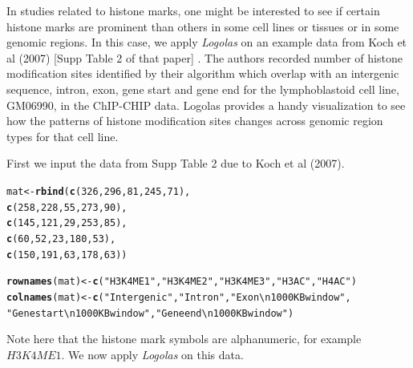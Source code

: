 \documentclass[12pt]{article}\usepackage[]{graphicx}\usepackage[usenames,dvipsnames]{color}
\makeatletter
\newcommand{\hlnum}[1]{\textcolor[rgb]{0.686,0.059,0.569}{#1}}%
\newcommand{\hlstr}[1]{\textcolor[rgb]{0.192,0.494,0.8}{#1}}%
\newcommand{\hlstd}[1]{\textcolor[rgb]{0.345,0.345,0.345}{#1}}%
\newcommand{\hlkwb}[1]{\textcolor[rgb]{0.69,0.353,0.396}{#1}}%
\newcommand{\hlkwd}[1]{\textcolor[rgb]{0.737,0.353,0.396}{\textbf{#1}}}%
\newenvironment{kframe}{%
 \def\at@end@of@kframe{}%
 \ifinner\ifhmode%
  \def\at@end@of@kframe{\end{minipage}}%
  \begin{minipage}{\columnwidth}%
 \fi\fi%
 \def\FrameCommand##1{\hskip\@totalleftmargin \hskip-\fboxsep
 \colorbox{shadecolor}{##1}\hskip-\fboxsep
     \hskip-\linewidth \hskip-\@totalleftmargin \hskip\columnwidth}%
 \MakeFramed {\advance\hsize-\width
   \@totalleftmargin\z@ \linewidth\hsize
   \@setminipage}}%
 {\par\unskip\endMakeFramed%
 \at@end@of@kframe}
\newenvironment{knitrout}{}{} %
\newcommand{\Logolas}{\textit{Logolas}}
\makeatother
\begin{document}
In studies related to histone marks, one might be interested to see if certain histone marks are prominent than others in some cell lines or tissues or in some genomic regions. In this case, we apply \Logolas{} on an example data from Koch et al (2007) [Supp Table 2 of that paper] \cite{Koch2007}. The authors recorded number of histone modification sites identified by their algorithm which overlap with an intergenic sequence, intron, exon, gene start and gene end for the lymphoblastoid cell line, GM06990, in the ChIP-CHIP data. Logolas provides a handy visualization to see how the patterns of histone modification sites changes across genomic region types for that cell line.

First we input the data from Supp Table 2 due to Koch et al (2007).

\begin{knitrout}
\color{fgcolor}\begin{kframe}
\begin{alltt}
\hlstd{mat} \hlkwb{<-} \hlkwd{rbind}\hlstd{(}\hlkwd{c}\hlstd{(}\hlnum{326}\hlstd{,} \hlnum{296}\hlstd{,} \hlnum{81}\hlstd{,} \hlnum{245}\hlstd{,} \hlnum{71}\hlstd{),}
             \hlkwd{c}\hlstd{(}\hlnum{258}\hlstd{,} \hlnum{228}\hlstd{,} \hlnum{55}\hlstd{,} \hlnum{273}\hlstd{,} \hlnum{90}\hlstd{),}
             \hlkwd{c}\hlstd{(}\hlnum{145}\hlstd{,} \hlnum{121}\hlstd{,} \hlnum{29}\hlstd{,} \hlnum{253}\hlstd{,} \hlnum{85}\hlstd{),}
             \hlkwd{c}\hlstd{(}\hlnum{60}\hlstd{,} \hlnum{52}\hlstd{,} \hlnum{23}\hlstd{,} \hlnum{180}\hlstd{,} \hlnum{53}\hlstd{),}
             \hlkwd{c}\hlstd{(}\hlnum{150}\hlstd{,} \hlnum{191}\hlstd{,} \hlnum{63}\hlstd{,} \hlnum{178}\hlstd{,} \hlnum{63}\hlstd{))}

\hlkwd{rownames}\hlstd{(mat)} \hlkwb{<-} \hlkwd{c}\hlstd{(}\hlstr{"H3K4ME1"}\hlstd{,} \hlstr{"H3K4ME2"}\hlstd{,} \hlstr{"H3K4ME3"}\hlstd{,} \hlstr{"H3AC"}\hlstd{,} \hlstr{"H4AC"}\hlstd{)}
\hlkwd{colnames}\hlstd{(mat)} \hlkwb{<-} \hlkwd{c}\hlstd{(}\hlstr{"Intergenic"}\hlstd{,}\hlstr{"Intron"}\hlstd{,}\hlstr{"Exon \textbackslash{}n 1000 KB window"}\hlstd{,}
                   \hlstr{"Gene start \textbackslash{}n 1000 KB window"}\hlstd{,}\hlstr{"Gene end \textbackslash{}n 1000 KB window"}\hlstd{)}
\end{alltt}
\end{kframe}
\end{knitrout}

Note here that the histone mark symbols are alphanumeric, for example $H3K4ME1$.
We now apply \Logolas{} on this data.
\end{document}
